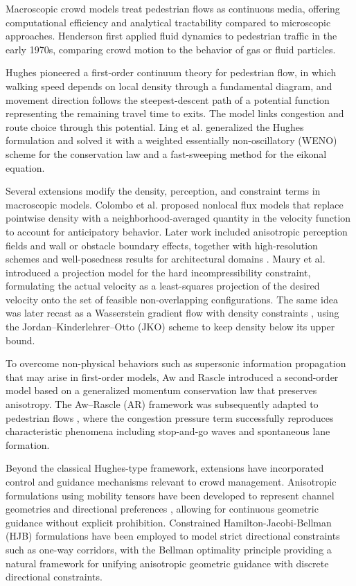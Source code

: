 \documentclass[lettersize,journal]{IEEEtran}
\begin{document}
Macroscopic crowd models treat pedestrian flows as continuous media, offering computational efficiency and analytical tractability compared to microscopic approaches.
Henderson \cite{RN282} first applied fluid dynamics to pedestrian traffic in the early 1970s, comparing crowd motion to the behavior of gas or fluid particles.

Hughes \cite{hughes2003} pioneered a first-order continuum theory for pedestrian flow, in which walking speed depends on local density through a fundamental diagram, and movement direction follows the steepest-descent path of a potential function representing the remaining travel time to exits.
The model links congestion and route choice through this potential.
Ling et al. \cite{RN2078} generalized the Hughes formulation and solved it with a weighted essentially non-oscillatory (WENO) scheme for the conservation law and a fast-sweeping method for the eikonal equation.

Several extensions modify the density, perception, and constraint terms in macroscopic models.
Colombo et al. \cite{RN2097} proposed nonlocal flux models that replace pointwise density with a neighborhood-averaged quantity in the velocity function to account for anticipatory behavior.
Later work included anisotropic perception fields and wall or obstacle boundary effects, together with high-resolution schemes and well-posedness results for architectural domains \cite{RN2080}.
Maury et al. \cite{RN2099} introduced a projection model for the hard incompressibility constraint, formulating the actual velocity as a least-squares projection of the desired velocity onto the set of feasible non-overlapping configurations.
The same idea was later recast as a Wasserstein gradient flow with density constraints \cite{RN2081}, using the Jordan--Kinderlehrer--Otto (JKO) scheme \cite{RN2188} to keep density below its upper bound.

To overcome non-physical behaviors such as supersonic information propagation that may arise in first-order models, Aw and Rascle \cite{RN2103} introduced a second-order model based on a generalized momentum conservation law that preserves anisotropy.
The Aw--Rascle (AR) framework was subsequently adapted to pedestrian flows \cite{RN2104}, where the congestion pressure term successfully reproduces characteristic phenomena including stop-and-go waves and spontaneous lane formation.

Beyond the classical Hughes-type framework, extensions have incorporated control and guidance mechanisms relevant to crowd management.
Anisotropic formulations using mobility tensors have been developed to represent channel geometries and directional preferences \cite{cristiani2016,priuli2015control}, allowing for continuous geometric guidance without explicit prohibition.
Constrained Hamilton-Jacobi-Bellman (HJB) formulations have been employed to model strict directional constraints such as one-way corridors, with the Bellman optimality principle providing a natural framework for unifying anisotropic geometric guidance with discrete directional constraints.
\end{document}
